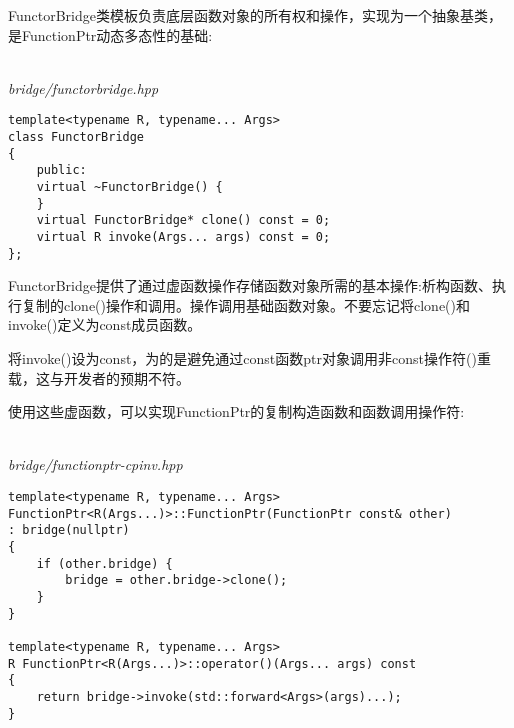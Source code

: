 FunctorBridge类模板负责底层函数对象的所有权和操作，实现为一个抽象基类，是FunctionPtr动态多态性的基础:

\hspace*{\fill} \\ %
\noindent
\textit{bridge/functorbridge.hpp}
\begin{lstlisting}[style=styleCXX]
template<typename R, typename... Args>
class FunctorBridge
{
	public:
	virtual ~FunctorBridge() {
	}
	virtual FunctorBridge* clone() const = 0;
	virtual R invoke(Args... args) const = 0;
};
\end{lstlisting}

FunctorBridge提供了通过虚函数操作存储函数对象所需的基本操作:析构函数、执行复制的clone()操作和调用。操作调用基础函数对象。不要忘记将clone()和invoke()定义为const成员函数。

\begin{tcolorbox}[colback=webgreen!5!white,colframe=webgreen!75!black]
\hspace*{0.75cm}将invoke()设为const，为的是避免通过const函数ptr对象调用非const操作符()重载，这与开发者的预期不符。
\end{tcolorbox}

使用这些虚函数，可以实现FunctionPtr的复制构造函数和函数调用操作符:

\hspace*{\fill} \\ %
\noindent
\textit{bridge/functionptr-cpinv.hpp}
\begin{lstlisting}[style=styleCXX]
template<typename R, typename... Args>
FunctionPtr<R(Args...)>::FunctionPtr(FunctionPtr const& other)
: bridge(nullptr)
{
	if (other.bridge) {
		bridge = other.bridge->clone();
	}
}

template<typename R, typename... Args>
R FunctionPtr<R(Args...)>::operator()(Args... args) const
{
	return bridge->invoke(std::forward<Args>(args)...);
}
\end{lstlisting}














































